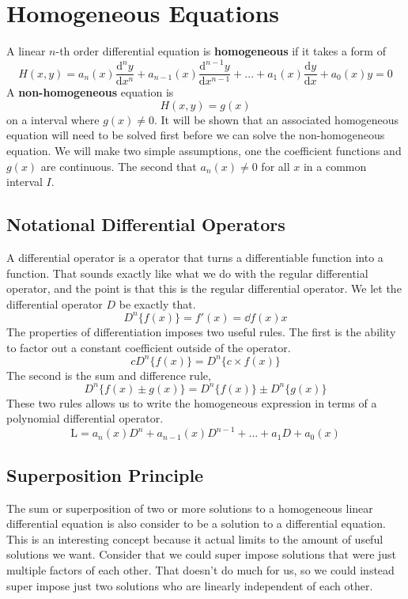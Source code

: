\chapter{Homogeneous Equations}
A linear $n$-th order differential equation is \textbf{homogeneous} if it takes a form of
\begin{equation*}
	H(x,y) = a_n(x)\frac{\mathrm{d}^ny}{\mathrm{d}x^n} + a_{n-1}(x)\frac{\mathrm{d}^{n-1}y}{\mathrm{d}x^{n-1}} + ... + a_1(x)\frac{\mathrm{d}y}{\mathrm{d}x} + a_0(x)y = 0
\end{equation*}
A \textbf{non-homogeneous} equation is 
\begin{equation*}
	H(x,y) = g(x)
\end{equation*}
on a interval where $g(x) \neq 0$. It will be shown that an associated homogeneous equation will need to be solved first before we can solve the non-homogeneous equation. We will make two simple assumptions, one the coefficient functions and $g(x)$ are continuous. The second that $a_n(x) \neq 0$ for all $x$ in a common interval $I$. 
\section{Notational Differential Operators}
A differential operator is a operator that turns a differentiable function into a function. That sounds exactly like what we do with the regular differential operator, and the point is that this is the regular differential operator. We let the differential operator $D$ be exactly that.  
\begin{equation*}
	D^n\{f(x)\} = f'(x) = \dd{f(x)}{x}
\end{equation*}
The properties of differentiation imposes two useful rules. The first is the ability to factor out a constant coefficient outside of the operator.  
\begin{equation*}
	cD^n\{f(x)\} = D^n\{c\times f(x)\}
\end{equation*}
The second is the sum and difference rule, 
\begin{equation*}
	D^n\{ f(x) \pm g(x) \} = D^n\{f(x)\} \pm D^n\{g(x)\}
\end{equation*}
These two rules allows us to write the homogeneous expression in terms of a polynomial differential operator. 
\begin{equation*}
	\mathrm{L} = a_n(x)D^n + a_{n-1}(x)D^{n-1} + ... + a_1D + a_0(x)
\end{equation*}
\pagebreak
\section{Superposition Principle}
The sum or superposition of two or more solutions to a homogeneous linear differential equation is also consider to be a solution to a differential equation. This is an interesting concept because it actual limits to the amount of useful solutions we want. Consider that we could super impose solutions that were just multiple factors of each other. That doesn't do much for us, so we could instead super impose just two solutions who are linearly independent of each other.


